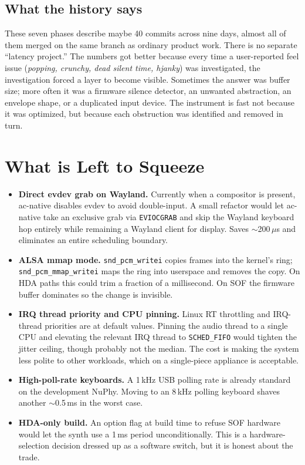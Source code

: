 \documentclass[10pt,letterpaper,twocolumn]{article}
\begin{document}
\subsection{What the history says}

These seven phases describe maybe 40 commits across nine days, almost all of them merged on the same branch as ordinary product work. There is no separate ``latency project.'' The numbers got better because every time a user-reported feel issue (\emph{popping, crunchy, dead silent time, hjanky}) was investigated, the investigation forced a layer to become visible. Sometimes the answer was buffer size; more often it was a firmware silence detector, an unwanted abstraction, an envelope shape, or a duplicated input device. The instrument is fast not because it was optimized, but because each obstruction was identified and removed in turn.


\section{What is Left to Squeeze}
\label{sec:future}

\begin{itemize}
  \item \textbf{Direct evdev grab on Wayland.} Currently when a compositor is present, ac-native disables evdev to avoid double-input. A small refactor would let ac-native take an exclusive grab via \texttt{EVIOCGRAB} and skip the Wayland keyboard hop entirely while remaining a Wayland client for display. Saves $\sim$200\,$\mu$s and eliminates an entire scheduling boundary.

  \item \textbf{ALSA mmap mode.} \texttt{snd\_pcm\_writei} copies frames into the kernel's ring; \texttt{snd\_pcm\_mmap\_writei} maps the ring into userspace and removes the copy. On HDA paths this could trim a fraction of a millisecond. On SOF the firmware buffer dominates so the change is invisible.

  \item \textbf{IRQ thread priority and CPU pinning.} Linux RT throttling and IRQ-thread priorities are at default values. Pinning the audio thread to a single CPU and elevating the relevant IRQ thread to \texttt{SCHED\_FIFO} would tighten the jitter ceiling, though probably not the median. The cost is making the system less polite to other workloads, which on a single-piece appliance is acceptable.

  \item \textbf{High-poll-rate keyboards.} A 1\,kHz USB polling rate is already standard on the development NuPhy. Moving to an 8\,kHz polling keyboard shaves another $\sim$0.5\,ms in the worst case.

  \item \textbf{HDA-only build.} An option flag at build time to refuse SOF hardware would let the synth use a 1\,ms period unconditionally. This is a hardware-selection decision dressed up as a software switch, but it is honest about the trade.
\end{itemize}
\end{document}
